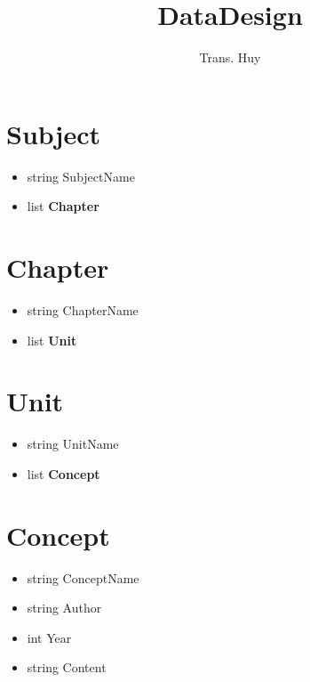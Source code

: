 \documentclass[12pt,a4paper]{article}
\author{Trans. Huy}
\title{DataDesign}
\begin{document}
	\maketitle
	\section{Subject}
	\begin{itemize}
		\item string SubjectName
		\item list \textbf{Chapter}
	\end{itemize}
	\section{Chapter}
	\begin{itemize}
		\item string ChapterName
		\item list \textbf{Unit}
	\end{itemize}
	\section{Unit}
	\begin{itemize}
		\item string UnitName
		\item list \textbf{Concept}
	\end{itemize}
	\section{Concept}
	\begin{itemize}
		\item string ConceptName
		\item string Author
		\item int Year
		\item string Content
	\end{itemize}
\end{document}
